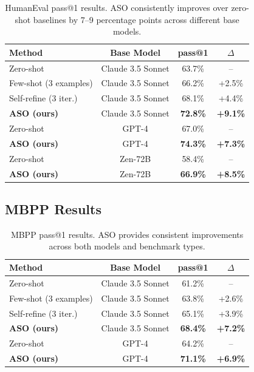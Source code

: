 \begin{table}[h]
\centering
\begin{tabular}{lccc}
\toprule
Method & Base Model & pass@1 & $\Delta$ \\
\midrule
Zero-shot & Claude 3.5 Sonnet & 63.7\% & -- \\
Few-shot (3 examples) & Claude 3.5 Sonnet & 66.2\% & +2.5\% \\
Self-refine (3 iter.) & Claude 3.5 Sonnet & 68.1\% & +4.4\% \\
\textbf{ASO (ours)} & Claude 3.5 Sonnet & \textbf{72.8\%} & \textbf{+9.1\%} \\
\midrule
Zero-shot & GPT-4 & 67.0\% & -- \\
\textbf{ASO (ours)} & GPT-4 & \textbf{74.3\%} & \textbf{+7.3\%} \\
\midrule
Zero-shot & Zen-72B & 58.4\% & -- \\
\textbf{ASO (ours)} & Zen-72B & \textbf{66.9\%} & \textbf{+8.5\%} \\
\bottomrule
\end{tabular}
\caption{HumanEval pass@1 results. ASO consistently improves over zero-shot
baselines by 7--9 percentage points across different base models.}
\label{tab:humaneval}
\end{table}

\subsection{MBPP Results}

\begin{table}[h]
\centering
\begin{tabular}{lccc}
\toprule
Method & Base Model & pass@1 & $\Delta$ \\
\midrule
Zero-shot & Claude 3.5 Sonnet & 61.2\% & -- \\
Few-shot (3 examples) & Claude 3.5 Sonnet & 63.8\% & +2.6\% \\
Self-refine (3 iter.) & Claude 3.5 Sonnet & 65.1\% & +3.9\% \\
\textbf{ASO (ours)} & Claude 3.5 Sonnet & \textbf{68.4\%} & \textbf{+7.2\%} \\
\midrule
Zero-shot & GPT-4 & 64.2\% & -- \\
\textbf{ASO (ours)} & GPT-4 & \textbf{71.1\%} & \textbf{+6.9\%} \\
\bottomrule
\end{tabular}
\caption{MBPP pass@1 results. ASO provides consistent improvements across
both models and benchmark types.}
\label{tab:mbpp}
\end{table}

